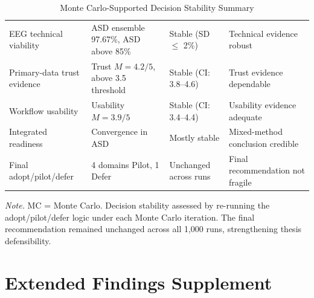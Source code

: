 {\tablestripes\tablefontsize

\begin{xltabular}{\textwidth}{@{} L L >{\raggedright\arraybackslash}p{2.0cm} L @{}}
\caption[Monte Carlo-Supported Decision Stability Summary]{Monte Carlo-Supported Decision Stability Summary}\label{tab:mc_decision_stability} \\
\toprule
{} &  &  &  \\
\midrule
\endfirsthead
\endhead
\bottomrule
\endlastfoot
EEG technical viability & ASD ensemble 97.67\%, ASD above 85\% & Stable (SD $\leq$ 2\%) & Technical evidence robust \\
Primary-data trust evidence & Trust $M = 4.2/5$, above 3.5 threshold & Stable (CI: 3.8--4.6) & Trust evidence dependable \\
Workflow usability & Usability $M = 3.9/5$ & Stable (CI: 3.4--4.4) & Usability evidence adequate \\
Integrated readiness & Convergence in ASD & Mostly stable & Mixed-method conclusion credible \\
Final adopt/pilot/defer & 4 domains Pilot, 1 Defer & Unchanged across runs & Final recommendation not fragile \\
\end{xltabular}}
\vspace{2pt}
\noindent\textit{Note.} MC = Monte Carlo. Decision stability assessed by re-running the adopt/pilot/defer logic under each Monte Carlo iteration. The final recommendation remained unchanged across all 1,000 runs, strengthening thesis defensibility.



\section*{Extended Findings Supplement}
\label{sec:appd_extended_supplement}

